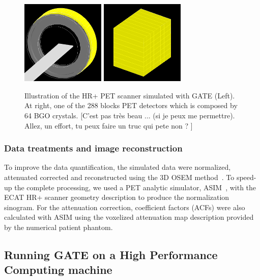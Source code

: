 \documentclass[11pt]{iopart}
\newcommand{\dsnote}[1]{{\color{green}[#1]}}
\begin{document}
\begin{figure}[!h]
\centering
\includegraphics[width=40mm,height=40mm]{figures/HR_Simu_Gate_GC.jpg}
\includegraphics[width=40mm,height=40mm]{figures/bloc_detec_HR.jpg}
\caption{Illustration of the HR+ PET scanner simulated with GATE
  (Left). At right, one of the 288 blocks PET detectors which is
  composed by 64 BGO crystals. \dsnote{C'est pas très beau ... (si je
    peux me permettre). Allez, un effort, tu peux faire un truc qui
    pete non ? }}
\label{fig:fig0}
\end{figure}

\subsubsection{Data treatments and image reconstruction}

To improve the data quantification, the simulated data were
normalized, attenuated corrected and reconstructed using the 3D OSEM
method~\cite{OSEM_ref}. To speed-up the complete processing, we used a
PET analytic simulator, ASIM~\cite{Comtat1999}, with the ECAT HR+
scanner geometry description to produce the normalization
sinogram. For the attenuation correction, coefficient factors (ACFs)
were also calculated with ASIM using the voxelized attenuation map
description provided by the numerical patient phantom.

\subsection{Running GATE on a High Performance Computing machine}
\end{document}
